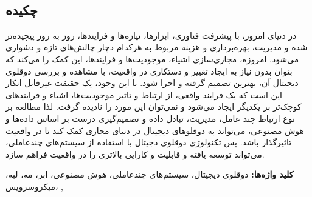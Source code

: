 
\setcounter{page}{1}
\thispagestyle{empty}

~\vfill

\subsection*{چکیده}
\baselineskip=0.7cm



در دنیای امروز، با پیشرفت فناوری، ابزار‌ها، نیاز‌ه‌ها و فرایند‌ها، روز به روز پیچیده‌تر شده و مدیریت، بهره‌برداری و هزینه مربوط به هرکدام دچار چالش‌های تازه‌ و دشواری می‌شود.
امروزه، مجازی‌سازی اشیاء، موجودیت‌ها و فرایند‌ها، این کمک را می‌کند که بتوان بدون نیاز به ایجاد تغییر و دستکاری در واقعیت، با مشاهده و بررسی دوقلوی دیجیتال آن، بهترین تصمیم گرفته و اجرا شود. 
با این وجود، یک حقیقت غیرقابل انکار این است که یک فرایند واقعی، از ارتباط و تاثیر موجودیت‌ها، اشیاء و فرایند‌های کوچک‌تر بر یکدیگر ایجاد می‌شود و نمی‌توان این مورد را نادیده گرفت. لذا مطالعه بر نوع ارتباط چند عامل، مدیریت،‌ تبادل داده و تصمیم‌گیری درست بر اساس داده‌ها و هوش مصنوعی، می‌تواند به دوقلو‌های دیجیتال در دنیای مجازی کمک کند تا در واقعیت تاثیرگذار باشد.
پس تکنولوژی دوقلو‌ی دجیتال با استفاده از سیستم‌های چندعاملی، می‌تواند توسعه یافته و قابلیت و کارایی بالاتری را در واقعیت فراهم سازد. \\




\begin{small}


\noindent\textbf{کلید ‌واژه‌ها:}
دوقلو‌ی دیجیتال، سیستم‌های چندعاملی، هوش‌ مصنوعی، ابر، مه، لبه، میکروسرویس،
,
\\


\end{small}